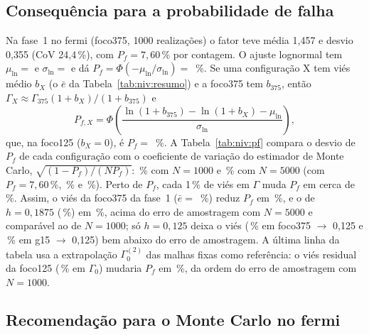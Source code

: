 \subsection{Consequência para a probabilidade de falha}\label{sec:ref:niveis:pf}

Na fase~1 no fermi (foco375, 1000 realizações) o fator teve média 1,457 e desvio 0,355 (CoV 24,4\,\%), com
$P_f = 7{,}60$\,\% por contagem. O ajuste lognormal tem $\mu_{\ln} = $ \nivMln{} e $\sigma_{\ln} = $ \nivSln{} e dá
$P_f = \Phi(-\mu_{\ln}/\sigma_{\ln}) = $ \nivPfLn\,\%. Se uma configuração X tem viés médio $b_X$ (o $\bar e$ da
Tabela~\ref{tab:niv:resumo}) e a foco375 tem $b_{375}$, então $\Gamma_X \approx \Gamma_{375}(1+b_X)/(1+b_{375})$ e
\begin{equation}
  P_{f,X} = \Phi\!\left(\frac{\ln(1+b_{375}) - \ln(1+b_X) - \mu_{\ln}}{\sigma_{\ln}}\right),
\end{equation}
que, na foco125 ($b_X = 0$), é $P_f = $ \nivPfRef\,\%. A Tabela~\ref{tab:niv:pf} compara o desvio de $P_f$ de cada
configuração com o coeficiente de variação do estimador de Monte Carlo, $\sqrt{(1-P_f)/(N P_f)}$: \nivCvMil\,\% com
$N = 1000$ e \nivCvCinco\,\% com $N = 5000$ (com $P_f = 7{,}60$\,\%, \nivCvMilCont\,\% e \nivCvCincoCont\,\%). Perto de
$P_f$, cada 1\,\% de viés em $\Gamma$ muda $P_f$ em cerca de \nivSensPf\,\%. Assim, o viés da foco375 da fase~1
($\bar e = $ \nivFfixAEmed\,\%) reduz $P_f$ em \nivFfixADpfAbs\,\%, e o de $h = 0{,}1875$ (\nivFBEmed\,\%) em
\nivFBDpfAbs\,\%, acima do erro de amostragem com $N = 5000$ e comparável ao de $N = 1000$; só $h = 0{,}125$ deixa o
viés (\nivFCDpfAbs\,\% em foco375 $\to$ 0,125 e \nivGCDpfAbs\,\% em g15 $\to$ 0,125) bem abaixo do erro de
amostragem. A última linha da tabela usa a extrapolação $\Gamma_0^{(2)}$ das malhas fixas como referência: o viés
residual da foco125 (\nivBzeroSinal\,\% em $\Gamma_0$) mudaria $P_f$ em \nivDpfZero\,\%, da ordem do erro de amostragem
com $N = 1000$.

\begin{table}[H]
  \centering\small
  \caption{Viés médio $\bar e$ em relação à foco125, $P_f$ resultante (lognormal da fase~1 corrigida pelo viés) e o
  desvio em relação a $P_f$ da foco125, comparados ao coeficiente de variação de Monte Carlo.}
  \label{tab:niv:pf}
  
\end{table}

\subsection{Recomendação para o Monte Carlo no fermi}\label{sec:ref:niveis:recomendacao}

